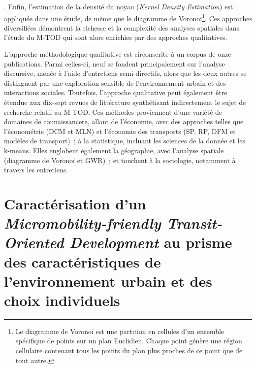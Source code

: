 \begin{refsegment}
{}. Enfin, l'estimation de la densité du noyau (\textsl{Kernel Density Estimation}) est appliquée dans une étude, de même que le diagramme de Voronoï\footnote{
    Le diagramme de Voronoï est une partition en cellules d'un ensemble spécifique de points sur un plan Euclidien. Chaque point génère une région cellulaire contenant tous les points du plan plus proches de ce point que de tout autre.
}. Ces approches diversifiées démontrent la richesse et la complexité des analyses spatiales dans l'étude du \acrshort{M-TOD} qui sont alors enrichies par des approches qualitatives.%

L'approche méthodologique qualitative est circonscrite à un corpus de onze publications. Parmi celles-ci, neuf se fondent principalement sur l'analyse discursive, menée à l'aide d'entretiens semi-directifs, alors que les deux autres se distinguent par une exploration sensible de l'environnement urbain et des interactions sociales. Toutefois, l'approche qualitative peut également être étendue aux dix-sept revues de littérature synthétisant indirectement le sujet de recherche relatif au \acrshort{M-TOD}. Ces méthodes proviennent d'une variété de domaines de connaissancere, allant de l'économie, avec des approches telles que l'économétrie (DCM et MLN) et l'économie des transports (SP, RP, DFM et modèles de transport)~; à la statistique, incluant les sciences de la donnée et les k-means. Elles englobent également la géographie, avec l'analyse spatiale (diagramme de Voronoï et GWR)~; et touchent à la sociologie, notamment à travers les entretiens.%

    \newpage
\section{Caractérisation d'un \textsl{Micromobility-friendly Transit-Oriented Development} au prisme des caractéristiques de l'environnement urbain et des choix individuels
    \label{chap2:caracterisation-btod-environnement-urbain-choix-individuels}
    }
    

\end{refsegment}
